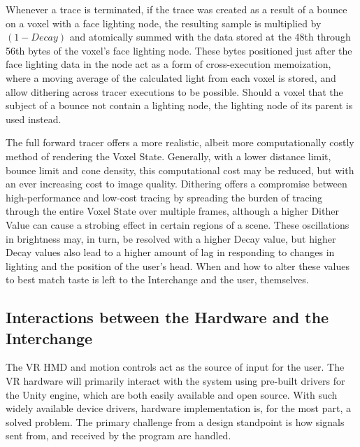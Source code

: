 \documentclass[onecolumn, draftclsnofoot,10pt, compsoc]{IEEEtran}
\newcounter{threesection}[subsubsection]
\begin{document}
Whenever a trace is terminated, if the trace was created as a result of a bounce on a voxel with a face lighting node, the resulting sample is multiplied by $(1-Decay)$ and atomically summed with the data stored at the 48th through 56th bytes of the voxel’s face lighting node. These bytes positioned just after the face lighting data in the node act as a form of cross-execution memoization, where a moving average of the calculated light from each voxel is stored, and allow dithering across tracer executions to be possible. Should a voxel that the subject of a bounce not contain a lighting node, the lighting node of its parent is used instead.


The full forward tracer offers a more realistic, albeit more computationally costly method of rendering the Voxel State. Generally, with a lower distance limit, bounce limit and cone density, this computational cost may be reduced, but with an ever increasing cost to image quality. Dithering offers a compromise between high-performance and low-cost tracing by spreading the burden of tracing through the entire Voxel State over multiple frames, although a higher Dither Value can cause a strobing effect in certain regions of a scene. These oscillations in brightness may, in turn, be resolved with a higher Decay value, but higher Decay values also lead to a higher amount of lag in responding to changes in lighting and the position of the user’s head. When and how to alter these values to best match taste is left to the Interchange and the user, themselves.



\subsection{Interactions between the Hardware and the Interchange}
The VR HMD and motion controls act as the source of input for the user. The VR hardware will primarily interact with the system using pre-built drivers for the Unity engine, which are both easily available and open source. With such widely available device drivers, hardware implementation is, for the most part, a solved problem. The primary challenge from a design standpoint is how signals sent from, and received by the program are handled.
\end{document}

